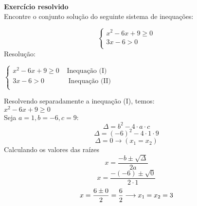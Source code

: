    \noindent
	\textbf{Exercício resolvido}\\

	Encontre o conjunto solução do seguinte sistema de inequações:
	
	\[ \left\{  
	\begin{array}{c}
		x^2 - 6x + 9 \ge 0\\
		3x - 6 > 0\\
	\end{array} 
	\right.
	\]
	\noindent
	Resolução:\\
	\begin{flushleft}
		$
		\left\{  
		\begin{array}{c}
			x^2 - 6x + 9 \ge 0 \;\;\;\; \text{Inequação (I)}\\
			3x - 6 > 0 \;\;\;\;\;\;\;\;\;\;\;\;\: \text{Inequação (II)}\\
		\end{array} 
		\right.
		$
	\end{flushleft}
	Resolvendo separadamente a inequação (I), temos:\\
	$ x^2 - 6x + 9 \ge 0$\\
	Seja $a=1, b=-6, c=9$:\\
	\[
	\Delta = b^2 - 4 \cdot a \cdot c
	\]
	\[
	\Delta = (-6)^2 - 4 \cdot 1 \cdot 9
	\]
	\[
	\Delta = 0 \longrightarrow (x_1 = x_2)
	\]
	Calculando os valores das raízes
	\[
	x = \dfrac{-b \pm \sqrt{ \Delta}}{2a}
	\]
	\[
	x = \dfrac{-(-6) \pm \sqrt{0}}{2 \cdot 1}
	\]
	\[
	x = \dfrac{6 \pm 0}{2} =\dfrac{6}{2}\longrightarrow x_1 = x_2 = 3\\
	\]
	
        \begin{center}
    \end{center}
	

